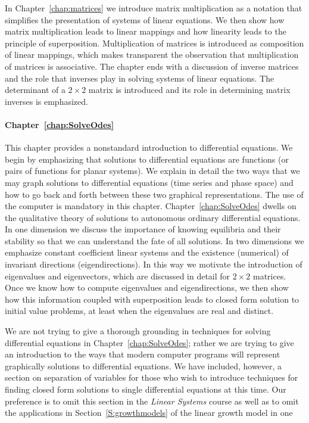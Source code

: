 \documentclass{ximera}
\begin{document}
In Chapter~\ref{chap:matrices} we introduce matrix multiplication as a
notation that simplifies the presentation of systems of linear equations.
We then show how matrix multiplication leads to linear mappings and how    
linearity leads to the principle of superposition.  Multiplication of 
matrices is introduced as composition of linear mappings, which makes 
transparent the observation that multiplication of matrices is associative.  
The chapter ends with a discussion of inverse matrices and the role that
inverses play in solving systems of linear equations.  The determinant of 
a $2\times 2$ matrix is introduced and its role in determining matrix
inverses is emphasized. 

\paragraph{Chapter~\ref{chap:SolveOdes}} This chapter provides a nonstandard 
introduction to differential equations.  We begin by emphasizing that 
solutions to differential equations are functions (or pairs of functions for 
planar systems).  We explain in detail the two ways that we may graph 
solutions to differential equations (time series and phase space) and how to 
go back and forth between these two graphical representations.  The use of 
the computer is mandatory in this chapter.  Chapter~\ref{chap:SolveOdes} 
dwells on the qualitative theory of solutions to autonomous ordinary 
differential equations.  In one dimension we discuss the importance of 
knowing equilibria and their stability so that we can understand the fate of 
all solutions.  In two dimensions we emphasize constant coefficient linear 
systems and the existence (numerical) of invariant directions 
(eigendirections).  In this way we motivate the introduction of eigenvalues 
and eigenvectors, which are discussed in detail for $2\times 2$ matrices.  
Once we know how to compute eigenvalues and eigendirections, we then show how
this information coupled with superposition leads to closed form solution to
initial value problems, at least when the eigenvalues are real and distinct.

We are not trying 
to give a thorough grounding in techniques for solving differential equations 
in Chapter~\ref{chap:SolveOdes}; rather we are trying to give an introduction 
to the ways that modern computer programs will represent graphically 
solutions to differential equations.  We have included, however, a section on 
separation of variables for those who wish to introduce techniques for 
finding closed form solutions to single differential equations at this time.  
Our preference is to omit this section in the {\em Linear Systems\/} course 
as well as to omit the applications in Section~\ref{S:growthmodels} of the 
linear growth model in one dimension to interest rates and population 
dynamics.  
\end{document}
